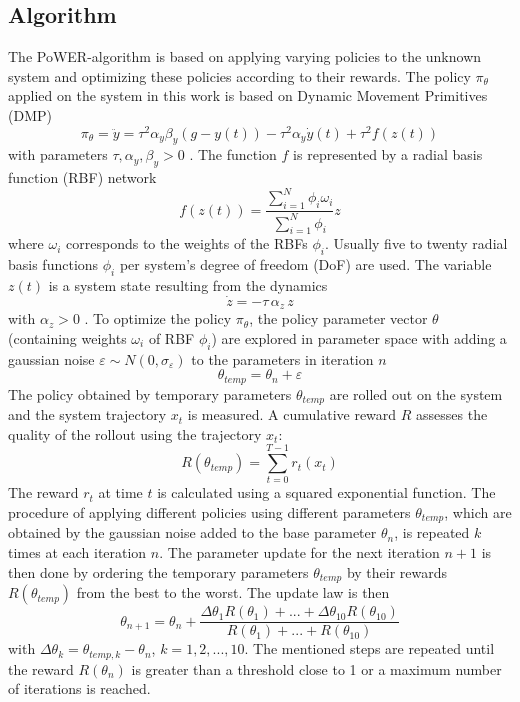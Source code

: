 \documentclass[letterpaper, 10 pt, conference]{ieeeconf}  %
\begin{document}
\subsection{Algorithm}
The PoWER-algorithm is based on applying varying policies to the unknown system and optimizing these policies according to their rewards.
The policy $\pi_\theta$ applied on the system in this work is based on Dynamic Movement Primitives (DMP)
\begin{equation}
\pi_{\theta}=\ddot{y}=\tau^{2}\alpha_y\beta_y(g-y(t))-\tau^{2}\alpha_y \dot{y}(t)+\tau^{2}f(z(t))
\end{equation}
with parameters $\tau,\alpha_y, \beta_y>0$ \cite{DMP_web}.
The function $f$ is represented by a radial basis function (RBF) network 
\begin{equation}
f(z(t))=\frac{\sum_{i=1}^N \phi_i \omega_i}{\sum_{i=1}^N \phi_i}z 
\end{equation}
where $\omega_i$ corresponds to the weights of the RBFs $\phi_i$. Usually five to twenty radial basis functions $\phi_i$ per system's degree of freedom (DoF) are used. The variable $z(t)$ is a system state resulting from the dynamics 
\begin{equation}
\dot{z}=-\tau\,\alpha_z \,z 
\end{equation}
with $\alpha_z>0$ \cite{DMP_web}.
To optimize the policy $\pi_\theta$, the policy parameter vector $\theta$ (containing weights $\omega_i$ of RBF $\phi_i$) are explored in parameter space with adding a gaussian noise $\varepsilon \sim N(0,\sigma_{\varepsilon})$ to the parameters in iteration $n$ \cite{kober2009policy}
\begin{equation}
\theta_{temp}=\theta_n+\varepsilon
\end{equation}
The policy obtained by temporary parameters $\theta_{temp}$ are rolled out on the system and the system trajectory $x_t$ is measured. A cumulative reward $R$ assesses the quality of the rollout using the trajectory $x_t$: %
\begin{equation}
R(\theta_{temp})=\sum_{t=0}^{T-1} r_t(x_t) 
\end{equation}
The reward $r_t$ at time $t$ is calculated using a squared exponential function. The procedure of applying different policies using different parameters $\theta_{temp}$, which are obtained by the gaussian noise added to the base parameter $\theta_n$, is repeated $k$ times at each iteration $n$. The parameter update for the next iteration $n+1$ is then done by ordering the temporary parameters $\theta_{temp}$ by their rewards $R(\theta_{temp})$ from the best to the worst. The update law is then
\begin{equation}
\theta_{n+1}=\theta_n+\frac{\Delta\theta_1 R(\theta_1)+...+\Delta\theta_{10} R(\theta_{10})}{R(\theta_1)+...+R(\theta_{10})}
\end{equation}
with $\Delta\theta_k=\theta_{temp,k}-\theta_n$, $k=1,2,...,10$. 
The mentioned steps are repeated until the reward $R(\theta_n)$ is greater than a threshold close to 1 or a maximum number of iterations is reached.
\end{document}
